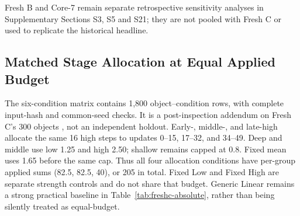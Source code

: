 \documentclass[times,twocolumn,final]{elsarticle}
\providecommand{\DIFadd}[1]{{\protect\color{blue} \sf #1}} %
\providecommand{\DIFaddbegin}{} %
\providecommand{\DIFaddend}{} %
\begin{document}
  \DIFaddbegin \DIFadd{Fresh B and Core-7 remain separate retrospective sensitivity analyses in Supplementary Sections S3, S5 }\DIFaddend and   \DIFaddbegin \DIFadd{S21; they are not pooled with Fresh C or used to replicate the historical headline.
}

\subsection{Matched Stage Allocation at Equal Applied Budget}
\label{subsec:matched-budget300}
\DIFadd{The six-condition matrix contains 1,800 object--condition rows, with complete input-hash and common-seed checks. It is a post-inspection addendum on Fresh C's }\DIFaddend 300 objects  \DIFaddbegin \DIFadd{, not an independent holdout. Early-, middle-, and late-high allocate the same 16 high steps to updates 0--15, 17--32, and 34--49. Deep and middle use low 1.25 and high 2.50; shallow remains capped at 0.8. Fixed mean uses 1.65 before the same cap. Thus all four allocation conditions have per-group applied sums (82.5, 82.5, 40), or 205 in total. Fixed Low and Fixed High are separate strength controls and do not share that budget. Generic Linear remains a strong practical baseline in Table~\ref{tab:freshc-absolute}, rather than being silently treated as equal-budget}\DIFaddend .
\end{document}
